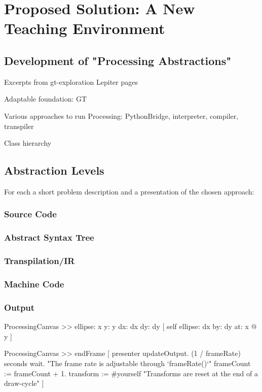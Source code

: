 
\chapter{Proposed Solution: A New Teaching Environment} \label{ch_pa}

\section{Development of "Processing Abstractions"}
Excerpts from gt-exploration Lepiter pages

\begin{todo}
\item Adaptable foundation: GT
\item Various approaches to run Processing: PythonBridge, interpreter, compiler, transpiler
\item Class hierarchy
\end{todo}


\section{Abstraction Levels}
For each a short problem description and a presentation of the chosen approach:

\subsection{Source Code}
\subsection{Abstract Syntax Tree}
\subsection{Transpilation/IR}
\subsection{Machine Code}
\subsection{Output}


\begin{code}
ProcessingCanvas >> ellipse: x y: y dx: dx dy: dy [
	self
		ellipse: dx
		by: dy
		at: x @ y
]
\end{code}


\begin{code}
ProcessingCanvas >> endFrame [
	presenter updateOutput.
	(1 / frameRate) seconds wait.	"The frame rate is adjustable through `frameRate()`"
	frameCount := frameCount + 1.
	transform := #yourself	"Transforms are reset at the end of a draw-cycle"
]
\end{code}
